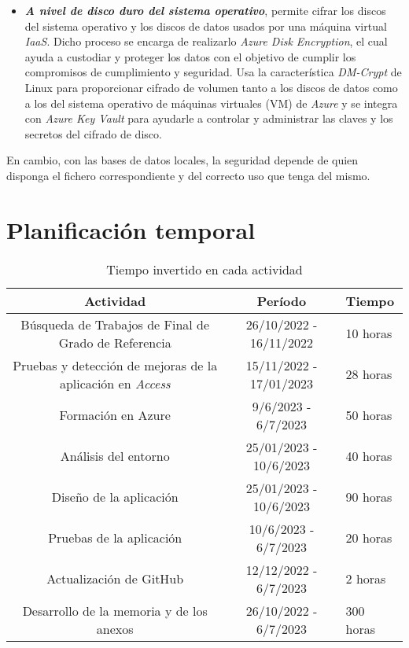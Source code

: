\begin{itemize}
\begin{itemize}
\begin{itemize}
            \end{itemize}
            \item \textbf{\textit{A nivel de disco duro del sistema operativo}}, permite cifrar los discos del sistema operativo y los discos de datos usados por una máquina virtual \textit{IaaS}.
            Dicho proceso se encarga de realizarlo \textit{Azure Disk Encryption}, el cual ayuda a custodiar y proteger los datos con el objetivo de cumplir los compromisos de cumplimiento y seguridad. 
            Usa la característica \textit{DM-Crypt} de Linux para proporcionar cifrado de volumen tanto a los discos de datos como a los del sistema operativo de máquinas virtuales (VM) de \textit{Azure} 
            y se integra con \textit{Azure Key Vault} para ayudarle a controlar y administrar las claves y los secretos del cifrado de disco.
        \end{itemize}
        En cambio, con las bases de datos locales, la seguridad depende de quien disponga el fichero correspondiente y del correcto uso que tenga del mismo.
    \end{itemize}

\section{Planificación temporal}

\begin{table}[H]
	\centering
	\begin{tabularx}{\linewidth}{>{\tiny}c >{\tiny}c >{\tiny}X}
	  \toprule
	  Actividad & Período & Tiempo \\
	  \midrule
	  Búsqueda de Trabajos de Final de Grado de Referencia & 26/10/2022 - 16/11/2022 & 10 horas \\
	  Pruebas y detección de mejoras de la aplicación en \textit{Access} & 15/11/2022 - 17/01/2023 & 28 horas \\
	  Formación en Azure & 9/6/2023 - 6/7/2023 & 50 horas \\
	  Análisis del entorno & 25/01/2023 - 10/6/2023 & 40 horas \\
	  Diseño de la aplicación & 25/01/2023 - 10/6/2023 & 90 horas \\
	  Pruebas de la aplicación & 10/6/2023 - 6/7/2023 & 20 horas \\
	  Actualización de GitHub & 12/12/2022 - 6/7/2023 & 2 horas \\
	  Desarrollo de la memoria y de los anexos & 26/10/2022 - 6/7/2023 & 300 horas \\
	  \bottomrule
	\end{tabularx}
	\caption{Tiempo invertido en cada actividad}
	\label{tabla:tiempo-invertido}
\end{table}







